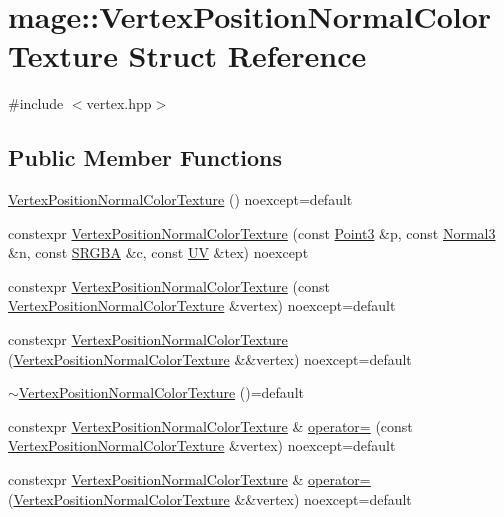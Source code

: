 \hypertarget{structmage_1_1_vertex_position_normal_color_texture}{}\section{mage\+:\+:Vertex\+Position\+Normal\+Color\+Texture Struct Reference}
\label{structmage_1_1_vertex_position_normal_color_texture}


{\ttfamily \#include $<$vertex.\+hpp$>$}

\subsection*{Public Member Functions}
\begin{DoxyCompactItemize}
\item 
\hyperlink{structmage_1_1_vertex_position_normal_color_texture_a50e877f0cef0e1422d5053a911c877ec}{Vertex\+Position\+Normal\+Color\+Texture} () noexcept=default
\item 
constexpr \hyperlink{structmage_1_1_vertex_position_normal_color_texture_aebe5436c626ab479073f9293777394de}{Vertex\+Position\+Normal\+Color\+Texture} (const \hyperlink{structmage_1_1_point3}{Point3} \&p, const \hyperlink{structmage_1_1_normal3}{Normal3} \&n, const \hyperlink{structmage_1_1_s_r_g_b_a}{S\+R\+G\+BA} \&c, const \hyperlink{structmage_1_1_u_v}{UV} \&tex) noexcept
\item 
constexpr \hyperlink{structmage_1_1_vertex_position_normal_color_texture_a3776106a96980079a321e7fd66605cb2}{Vertex\+Position\+Normal\+Color\+Texture} (const \hyperlink{structmage_1_1_vertex_position_normal_color_texture}{Vertex\+Position\+Normal\+Color\+Texture} \&vertex) noexcept=default
\item 
constexpr \hyperlink{structmage_1_1_vertex_position_normal_color_texture_ae453b2d23359d907f13a377d03221a0a}{Vertex\+Position\+Normal\+Color\+Texture} (\hyperlink{structmage_1_1_vertex_position_normal_color_texture}{Vertex\+Position\+Normal\+Color\+Texture} \&\&vertex) noexcept=default
\item 
\hyperlink{structmage_1_1_vertex_position_normal_color_texture_af3538a12eab74715dd9b5256f8765162}{$\sim$\+Vertex\+Position\+Normal\+Color\+Texture} ()=default
\item 
constexpr \hyperlink{structmage_1_1_vertex_position_normal_color_texture}{Vertex\+Position\+Normal\+Color\+Texture} \& \hyperlink{structmage_1_1_vertex_position_normal_color_texture_a97ad96dc018b200c1fd0c86586ddd5fc}{operator=} (const \hyperlink{structmage_1_1_vertex_position_normal_color_texture}{Vertex\+Position\+Normal\+Color\+Texture} \&vertex) noexcept=default
\item 
constexpr \hyperlink{structmage_1_1_vertex_position_normal_color_texture}{Vertex\+Position\+Normal\+Color\+Texture} \& \hyperlink{structmage_1_1_vertex_position_normal_color_texture_a495b54b0ea751f40d53abc2ffc336557}{operator=} (\hyperlink{structmage_1_1_vertex_position_normal_color_texture}{Vertex\+Position\+Normal\+Color\+Texture} \&\&vertex) noexcept=default
\end{DoxyCompactItemize}
